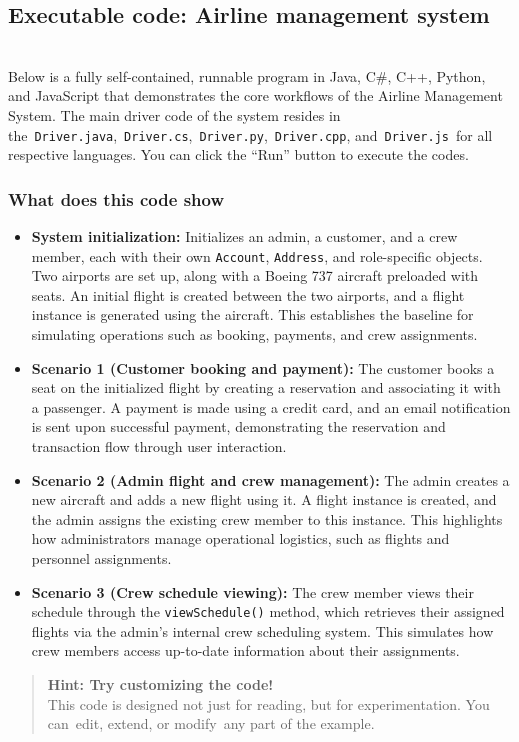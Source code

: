 \subsection{Executable code: Airline management system}\label{hgwDc5tfqfmWkL3eAyJr8}
\\
Below is a fully self-contained, runnable program in Java, C\#, C++, Python, and JavaScript that demonstrates the core workflows of the Airline Management System. The main driver code of the system resides in the~\texttt{Driver.java},~\texttt{Driver.cs},~\texttt{Driver.py},~\texttt{Driver.cpp}, and~\texttt{Driver.js}~for all respective languages. You can click the ``Run'' button to execute the codes.

\subsubsection{What does this code show}\label{0iIWSHM84aHEXUV_7iXLT}

\begin{itemize}
\item
\protect{}\label{lZSH5-mzHIs8g6dW6Lcxy}
\textbf{System initialization:} Initializes an admin, a customer, and a crew member, each with their own \texttt{Account}, \texttt{Address}, and role-specific objects. Two airports are set up, along with a Boeing 737 aircraft preloaded with seats. An initial flight is created between the two airports, and a flight instance is generated using the aircraft. This establishes the baseline for simulating operations such as booking, payments, and crew assignments.
\item
\protect{}\label{ikL53EhQVo2l1n5uNfqVQ}
\textbf{Scenario 1 (Customer booking and payment):} The customer books a seat on the initialized flight by creating a reservation and associating it with a passenger. A payment is made using a credit card, and an email notification is sent upon successful payment, demonstrating the reservation and transaction flow through user interaction.
\item
\protect{}\label{RPEljgTplN7Qth4nmAdyQ}
\textbf{Scenario 2 (Admin flight and crew management):} The admin creates a new aircraft and adds a new flight using it. A flight instance is created, and the admin assigns the existing crew member to this instance. This highlights how administrators manage operational logistics, such as flights and personnel assignments.
\item
\protect{}\label{kehlXwfqd2rakjLQr-3Ia}
\textbf{Scenario 3 (Crew schedule viewing):} The crew member views their schedule through the \texttt{viewSchedule()} method, which retrieves their assigned flights via the admin's internal crew scheduling system. This simulates how crew members access up-to-date information about their assignments.
\end{itemize}
\begin{quote}
\textbf{Hint: Try customizing the code!}\\
This code is designed not just for reading, but for experimentation. You can~edit, extend, or modify~any part of the example.
\end{quote}
